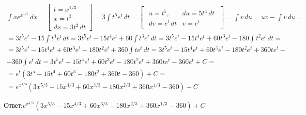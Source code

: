 \begin{eqnarray*}
  \int x e^{x^{1/3}}\, dx
  = \begin{bmatrix}
    t = x^{1/3}\\
    x = t^3\\
    dx = 3t^2\, dt
  \end{bmatrix}
  = 3 \int t^5 e^t\, dt
  = \begin{bmatrix}
    \begin{array}{ll}
      u = t^5, & du = 5t^4\, dt\\
      dv = e^t\, dt & v = e^t
    \end{array}
  \end{bmatrix}
  = \int v\, du = uv - \int v\, du
  =\\= 3 t^5 e^t 
  - 15 \int t^4 e^t\, dt
  = 3 t^5 e^t 
  - 15 t^4 e^t
  + 60 \int t^3 e^t\, dt
  = 3 t^5 e^t 
  - 15 t^4 e^t
  + 60 t^3 e^t
  - 180 \int t^2 e^t\, dt
  =\\= 3 t^5 e^t 
  - 15 t^4 e^t
  + 60 t^3 e^t
  - 180 t^2 e^t
  + 360 \int t e^t\, dt
  = 3 t^5 e^t 
  - 15 t^4 e^t
  + 60 t^3 e^t
  - 180 t^2 e^t
  + 360 t e^t
  -\\- 360 \int e^t\, dt
  = 3 t^5 e^t 
  - 15 t^4 e^t
  + 60 t^3 e^t
  - 180 t^2 e^t
  + 360 t e^t
  - 360 e^t
  + C
  =\\= e^t (3 t^5 - 15 t^4 + 60 t^3 - 180 t^2 + 360 t - 360) 
  + C
  =\\= e^{x^{1/3}} (3 x^{5/3} - 15 x^{4/3} + 60 x^{3/3} - 180 x^{2/3} + 360 x^{1/3} - 360) 
  + C
\end{eqnarray*}

\(
\textbf{Ответ:}
e^{x^{1/3}} (3 x^{5/3} - 15 x^{4/3} + 60 x^{3/3} - 180 x^{2/3} + 360 x^{1/3} - 360) 
+ C
\)